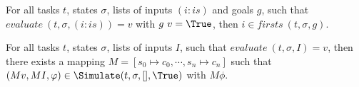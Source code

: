 \begin{lemma}
  \label{lem:completefirsts}

  For all tasks $t$, states $\sigma$, lists of inputs $(i:is)$ and goals $g$,
  such that $evaluate\ (t,\sigma,(i:is))=v$ with $g\ v =\True$,
  then $i\in firsts\ (t,\sigma,g)$.

\end{lemma}


\begin{lemma}
  \label{lem:completesimulate}
  For all tasks $t$, states $\sigma$, lists of inputs $I$,
  such that $evaluate\ (t,\sigma,I)=v$,
  then there exists a mapping $M = [s_0\mapsto c_0,\cdots,s_n\mapsto c_n]$
  such that $(M v,M I,\phi)\in\Simulate(t,\sigma,[],\True)$ with $M \phi$.
\end{lemma}
